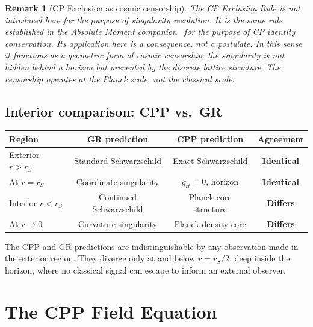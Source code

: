 \documentclass[12pt]{article}
\newtheorem{remark}[theorem]{Remark}
\begin{document}
\begin{remark}[CP Exclusion as cosmic censorship]
The CP Exclusion Rule is not introduced here for the purpose of
singularity resolution.  It is the same rule established in the
Absolute Moment companion~\cite{c1} for the purpose of CP identity
conservation.  Its application here is a \emph{consequence}, not
a postulate.  In this sense it functions as a geometric form of
cosmic censorship: the singularity is not hidden behind a horizon
but prevented by the discrete lattice structure.  The censorship
operates at the Planck scale, not the classical scale.
\end{remark}

\subsection{Interior comparison: CPP vs.\ GR}
\label{subsec:comparison}

\begin{center}
\renewcommand{\arraystretch}{1.4}
\begin{tabular}{@{}lccc@{}}
\toprule
Region & GR prediction & CPP prediction & Agreement \\
\midrule
Exterior $r > r_S$   & Standard Schwarzschild & Exact Schwarzschild & \textbf{Identical} \\
At $r = r_S$         & Coordinate singularity & $g_{tt} = 0$, horizon & \textbf{Identical} \\
Interior $r < r_S$   & Continued Schwarzschild & Planck-core structure & \textbf{Differs} \\
At $r \to 0$         & Curvature singularity & Planck-density core & \textbf{Differs} \\
\bottomrule
\end{tabular}
\end{center}

The CPP and GR predictions are indistinguishable by any observation
made in the exterior region.  They diverge only at and below $r = r_S/2$,
deep inside the horizon, where no classical signal can escape to inform
an external observer.

\section{The CPP Field Equation}
\label{sec:field_eq}
\end{document}
